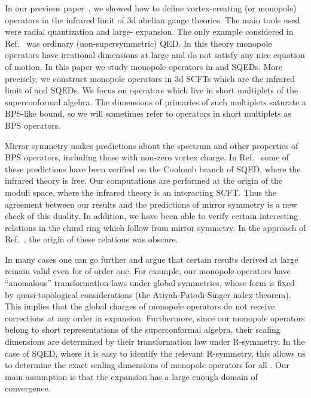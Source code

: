 \documentclass[a4paper,12pt, amsfonts, amssymb]{article}
\begin{document}
In our previous paper~\cite{BKWone}, we showed how to define
vortex-creating (or monopole) operators in the infrared limit
of 3d abelian gauge theories. The main tools used were radial 
quantization and large-\coordHE{} expansion. 
The only example considered in Ref.~\cite{BKWone} was ordinary
(non-supersymmetric) QED.
In this theory monopole operators have irrational dimensions
at large \coordHE{} and do not satisfy any nice equation of motion. 
In this paper we study monopole operators in \coordHE{} and \coordHE{} SQEDs.
More precisely, we construct monopole operators in 3d SCFTs which
are the infrared limit of \coordHE{} and \coordHE{} SQEDs. We focus on
operators which live in short multiplets of the superconformal algebra.
The dimensions of primaries of such multiplets saturate a BPS-like
bound, so we will sometimes refer to operators in short multiplets
as BPS operators.

Mirror symmetry makes predictions about the spectrum and other properties 
of BPS operators, including those with non-zero vortex charge. 
In Ref.~\cite{five} some of these predictions have been
verified on the Coulomb branch of \coordHE{} SQED, where the infrared theory is free. Our computations are performed at the origin of the moduli space, where the infrared theory is an interacting SCFT. Thus the agreement between our 
results and the predictions of mirror symmetry is a new check of this
duality. In addition, we have been able to verify certain interesting
relations in the chiral ring which follow from mirror symmetry.
In the approach of Ref.~\cite{five}, the origin of these relations was
obscure.

In many cases one can go further and argue that certain results derived at large \coordHE{} remain valid even for \coordHE{} of order one. For example, our
monopole operators have ``anomalous'' transformation laws under global symmetries, whose form is fixed by quasi-topological considerations 
(the Atiyah-Patodi-Singer index theorem). 
This implies that the global charges of monopole operators do not receive corrections at any order in \coordHE{} expansion. 
Furthermore, since our monopole operators belong
to short representations of the superconformal algebra, their scaling
dimensions are determined by their transformation law under R-symmetry.
In the case of \coordHE{} SQED, where it is easy to identify the relevant R-symmetry, this allows us to determine the exact scaling dimensions of monopole operators for all \coordHE{}. Our main assumption is that the
\coordHE{} expansion has a large enough domain of convergence.
\end{document}
